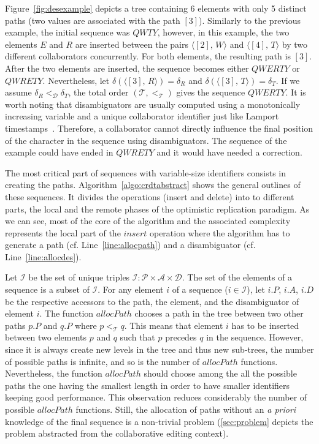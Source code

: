 Figure~\ref{fig:desexample} depicts a tree containing 6 elements with only 5
distinct paths (two values are associated with the path $[3]$). Similarly to
the previous example, the initial sequence was $QWTY$, however, in this
example, the two elements $E$ and $R$ are inserted between the pairs
$\langle [2],\, W\rangle$ and $\langle [4],\,T\rangle$ by two different
collaborators concurrently. For both elements, the resulting path is
$[3]$. After the two elements are inserted, the sequence becomes either
$QWERTY$ or $QWRETY$. Nevertheless, let
$\delta(\langle [3],\, R \rangle) = \delta_R$ and
$\delta(\langle [3],\, T\rangle) = \delta_T$. If we assume
$\delta_R <_\mathcal{D} \delta_T$, the total order
$(\mathcal{T}, <_\mathcal{T})$ gives the sequence $QWERTY$. It is worth noting
that disambiguators are usually computed using a monotonically increasing
variable and a unique collaborator identifier just like Lamport
timestamps~\cite{lamport1978time}. Therefore, a collaborator cannot directly
influence the final position of the character in the sequence using
disambiguators. The sequence of the example could have ended in $QWRETY$ and it
would have needed a correction.

The most critical part of sequences with variable-size identifiers consists in
creating the paths. Algorithm~\ref{algo:crdtabstract} shows the general
outlines of these sequences. It divides the operations (insert and delete) into
to different parts, the local and the remote phases of the optimistic
replication paradigm. As we can see, most of the core of the algorithm and the
associated complexity represents the local part of the $insert$ operation where
the algorithm has to generate a path (cf. Line~\ref{line:allocpath}) and a
disambiguator (cf. Line~\ref{line:allocdes}).

Let $\mathcal{I}$ be the set of unique triples
$\mathcal{I}: \mathcal{P}\times\mathcal{A}\times\mathcal{D}$. The set of the
elements of a sequence is a subset of $\mathcal{I}$. For any element $i$ of a
sequence ($i \in \mathcal{I}$), let $i.P$, $i.A$, $i.D$ be the respective
accessors to the path, the element, and the disambiguator of element $i$. The
function $allocPath$ chooses a path in the tree between two other paths $p.P$
and $q.P$ where $p<_{\mathcal{T}}q$. This means that element $i$ has to be
inserted between two elements $p$ and $q$ such that $p$ precedes $q$ in the
sequence. However, since it is always create new levels in the tree and thus
new sub-trees, the number of possible paths is infinite, and so is the number
of $allocPath$ functions. Nevertheless, the function $allocPath$ should choose
among the all the possible paths the one having the smallest length in order to
have smaller identifiers keeping good performance. This observation reduces
considerably the number of possible $allocPath$ functions. Still, the
allocation of paths without an \emph{a priori} knowledge of the final sequence
is a non-trivial problem (\ref{sec:problem} depicts the problem abstracted from
the collaborative editing context).

